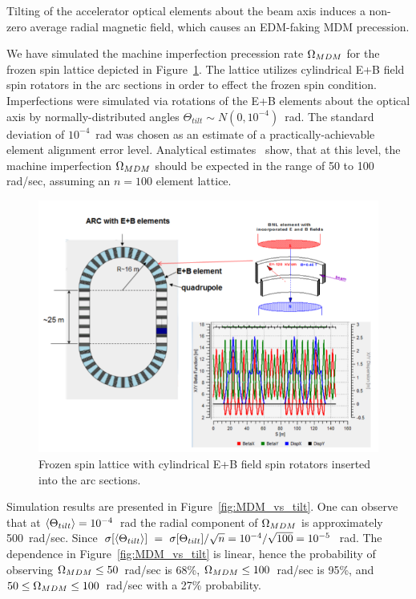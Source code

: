 Tilting of the accelerator optical elements about the beam axis induces a non-zero average radial magnetic field, which causes an EDM-faking MDM precession. 

We have simulated the machine imperfection precession rate $\Omega_{MDM}$ for the frozen spin lattice depicted in Figure~\ref{fig:Lattice}. The lattice utilizes cylindrical E+B field spin rotators in the arc sections in order to effect the frozen spin condition. Imperfections were simulated via rotations of the E+B elements about the optical axis by normally-distributed angles $\Theta_{tilt}\sim N(0,10^{-4})$~rad. The standard deviation of $10^{-4}$~rad was chosen as an estimate of a practically-achievable element alignment error level. Analytical estimates~\cite{Senichev:FDM} show, that at this level, the machine imperfection $\Omega_{MDM}$ should be expected in the range of 50 to 100 rad/sec, assuming an $n=100$ element lattice.

\begin{figure}[h]\centering
	\includegraphics[width=\linewidth]{Figures/BNL}
	\caption{Frozen spin lattice with cylindrical E+B field spin rotators inserted into the arc sections.\label{fig:Lattice}}
\end{figure}

Simulation results are presented in Figure~\ref{fig:MDM_vs_tilt}. One can observe that at $\langle{\Theta_{tilt}}\rangle=10^{-4}$~rad the radial component of $\Omega_{MDM}$ is approximately 500~rad/sec. 
Since $\sigma[\langle{\Theta_{tilt}}\rangle]~=~\sigma[\Theta_{tilt}]/\sqrt{n} = 10^{-4}/\sqrt{100} = 10^{-5}$~rad. The dependence in Figure~\ref{fig:MDM_vs_tilt} is linear, hence the probability of observing $\Omega_{MDM}\le 50$~rad/sec is 68\%, $\Omega_{MDM}\le 100$~rad/sec is 95\%, and $50\le\Omega_{MDM}\le100$~rad/sec with a 27\% probability.

